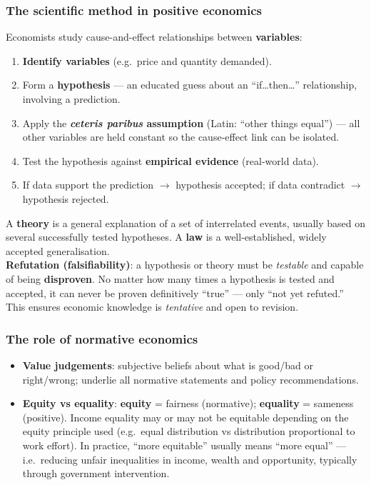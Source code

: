 \documentclass[a4paper,12pt]{article}
\begin{document}
\subsubsection*{The scientific method in positive economics}
Economists study cause-and-effect relationships between \textbf{variables}:
\begin{enumerate}
  \item \textbf{Identify variables} (e.g.\ price and quantity demanded).
  \item Form a \textbf{hypothesis} --- an educated guess about an ``if\dots then\dots'' relationship, involving a prediction.
  \item Apply the \textbf{\textit{ceteris paribus} assumption} (Latin: ``other things equal'') --- all other variables are held constant so the cause-effect link can be isolated.
  \item Test the hypothesis against \textbf{empirical evidence} (real-world data).
  \item If data support the prediction $\to$ hypothesis accepted; if data contradict $\to$ hypothesis rejected.
\end{enumerate}
A \textbf{theory} is a general explanation of a set of interrelated events, usually based on several successfully tested hypotheses. A \textbf{law} is a well-established, widely accepted generalisation.\\
\textbf{Refutation (falsifiability)}: a hypothesis or theory must be \textit{testable} and capable of being \textbf{disproven}. No matter how many times a hypothesis is tested and accepted, it can never be proven definitively ``true'' --- only ``not yet refuted.'' This ensures economic knowledge is \textit{tentative} and open to revision.
\subsubsection*{The role of normative economics}
\begin{itemize}
  \item \textbf{Value judgements}: subjective beliefs about what is good/bad or right/wrong; underlie all normative statements and policy recommendations.
  \item \textbf{Equity vs equality}: \textbf{equity} = fairness (normative); \textbf{equality} = sameness (positive). Income equality may or may not be equitable depending on the equity principle used (e.g.\ equal distribution vs distribution proportional to work effort). In practice, ``more equitable'' usually means ``more equal'' --- i.e.\ reducing unfair inequalities in income, wealth and opportunity, typically through government intervention.
\end{itemize}
\end{document}
